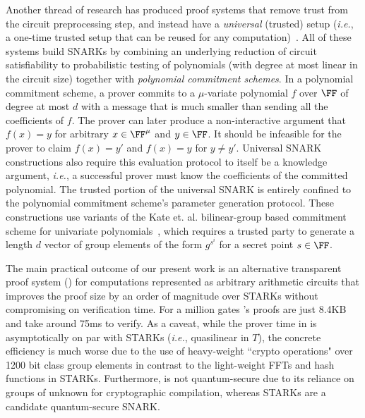 Another thread of research has produced proof systems that remove trust from the circuit preprocessing step, and instead have a \emph{universal} (trusted) setup (\emph{i.e.}, a one-time trusted setup that can be reused for any computation)~\cite{Sonic,Libra,Spartan,Plonk}. All of these systems build SNARKs by combining an underlying reduction of circuit satisfiability to probabilistic testing of polynomials (with degree at most linear in the circuit size) together with \emph{polynomial commitment schemes}. In a polynomial commitment scheme, a prover commits to a $\mu$-variate polynomial $f$ over $\FF$ of degree at most $d$ with a message that is much smaller than sending all the coefficients of $f$. The prover can later produce a non-interactive argument that $f(x) = y$ for arbitrary $x \in \FF^\mu$ and $y \in \FF$. It should be infeasible for the prover to claim $f(x) = y'$ and $f(x) = y$ for $y \neq y'$. Universal SNARK constructions also require this evaluation protocol to itself be a knowledge argument, \emph{i.e.}, a successful prover must know the coefficients of the committed polynomial. The trusted portion of the universal SNARK is entirely confined to the polynomial commitment scheme's parameter generation protocol. These constructions use variants of the Kate et. al. bilinear-group based commitment scheme for univariate polynomials~\cite{AC:KatZavGol10}, which requires a trusted party to generate a length $d$ vector of group elements of the form $g^{s^i}$ for a secret point $s \in \FF$. 

The main practical outcome of our present work is an alternative transparent proof system () for computations represented as arbitrary arithmetic circuits that improves the proof size by an order of magnitude over STARKs without compromising on verification time. For a million gates 's proofs are just 8.4KB and take around 75ms to verify. 
As a caveat, while the prover time in  is asymptotically on par with STARKs (\emph{i.e.}, quasilinear in $T$), the concrete efficiency is much worse due to the use of heavy-weight ``crypto operations" over 1200 bit class group elements in contrast to the light-weight FFTs and hash functions in STARKs. Furthermore,  is not quantum-secure due to its reliance on groups of unknown for cryptographic compilation, whereas STARKs are a candidate quantum-secure SNARK. 

